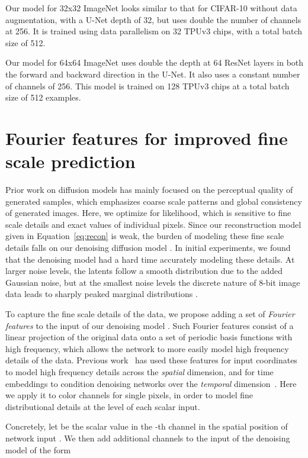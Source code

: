 \documentclass{article}
\def\Eqref#1{Equation~\ref{#1}}
\begin{document}
Our model for 32x32 ImageNet looks similar to that for CIFAR-10 without data augmentation, with a U-Net depth of 32, but uses double the number of channels at 256. It is trained using data parallelism on 32 TPUv3 chips, with a total batch size of 512.

Our model for 64x64 ImageNet uses double the depth at 64 ResNet layers in both the forward and backward direction in the U-Net. It also uses a constant number of channels of 256. This model is trained on 128 TPUv3 chips at a total batch size of 512 examples. 

\section{Fourier features for improved fine scale prediction}
\label{sec:fourier}
Prior work on diffusion models has mainly focused on the perceptual quality of generated samples, which emphasizes coarse scale patterns and global consistency of generated images. Here, we optimize for likelihood, which is sensitive to fine scale details and exact values of individual pixels. Since our reconstruction model  given in \Eqref{eq:recon} is weak, the burden of modeling these fine scale details falls on our denoising diffusion model . In initial experiments, we found that the denoising model had a hard time accurately modeling these details. At larger noise levels, the latents  follow a smooth distribution due to the added Gaussian noise, but at the smallest noise levels the discrete nature of 8-bit image data leads to sharply peaked marginal distributions .



To capture the fine scale details of the data, we propose adding a set of \emph{Fourier features} to the input of our denoising model . Such Fourier features consist of a linear projection of the original data onto a set of periodic basis functions with high frequency, which allows the network to more easily model high frequency details of the data. Previous work~\citep{tancik2020fourier} has used these features for input coordinates to model high frequency details across the \emph{spatial} dimension, and for time embeddings to condition denoising networks over the \emph{temporal} dimension~\citep{song2020score}. Here we apply it to color channels for single pixels, in order to model fine distributional details at the level of each scalar input.

Concretely, let  be the scalar value in the -th channel in the  spatial position of network input . We then add additional channels to the input of the denoising model of the form
\end{document}
